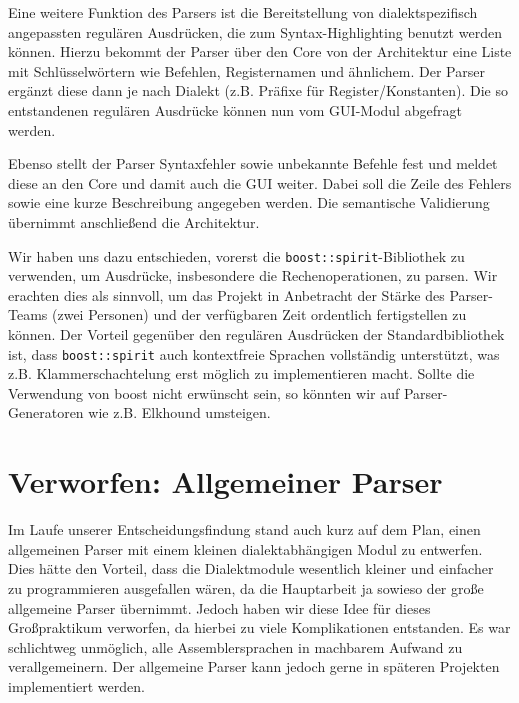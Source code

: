 Eine weitere Funktion des Parsers ist die Bereitstellung von dialektspezifisch
angepassten regulären Ausdrücken, die zum Syntax-Highlighting benutzt werden
können. Hierzu bekommt der Parser über den Core von der Architektur eine Liste
mit Schlüsselwörtern wie Befehlen, Registernamen und ähnlichem. Der Parser
ergänzt diese dann je nach Dialekt (z.B. Präfixe für Register/Konstanten). Die
so entstandenen regulären Ausdrücke können nun vom GUI-Modul abgefragt werden.

Ebenso stellt der Parser Syntaxfehler sowie unbekannte Befehle fest und meldet diese an den Core
und damit auch die GUI weiter. Dabei soll die Zeile des Fehlers sowie eine kurze Beschreibung angegeben werden.
Die semantische Validierung übernimmt anschließend die Architektur.

Wir haben uns dazu entschieden, vorerst die \lstinline[style=C++]!boost::spirit!-Bibliothek zu
verwenden, um Ausdrücke, insbesondere die Rechenoperationen, zu parsen.  Wir erachten dies als sinnvoll, um das
Projekt in Anbetracht der Stärke des Parser-Teams (zwei Personen) und der
verfügbaren Zeit ordentlich fertigstellen zu können. Der Vorteil gegenüber den
regulären Ausdrücken der Standardbibliothek ist, dass \lstinline[style=C++]!boost::spirit! auch kontextfreie Sprachen vollständig unterstützt, was z.B. Klammerschachtelung erst möglich zu implementieren macht.
Sollte die Verwendung von boost nicht erwünscht sein, so könnten wir auf Parser-Generatoren wie z.B. Elkhound umsteigen. %

\section{Verworfen: Allgemeiner Parser} Im Laufe unserer Entscheidungsfindung
stand auch kurz auf dem Plan, einen allgemeinen Parser mit einem kleinen
dialektabhängigen Modul zu entwerfen.  Dies hätte den Vorteil, dass die
Dialektmodule wesentlich kleiner und einfacher zu programmieren ausgefallen
wären, da die Hauptarbeit ja sowieso der große allgemeine Parser übernimmt.
Jedoch haben wir diese Idee für dieses Großpraktikum verworfen, da hierbei zu
viele Komplikationen entstanden. Es war schlichtweg unmöglich,
alle Assemblersprachen in machbarem Aufwand zu verallgemeinern.
Der allgemeine Parser kann jedoch gerne in späteren Projekten implementiert werden.
